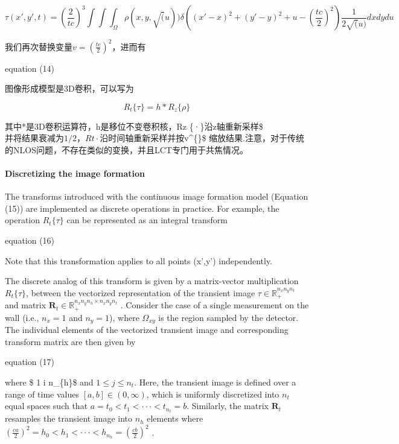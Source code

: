 \documentclass[11pt]{article}
\begin{document}
\[\tau(x',y',t)=(\frac{2}{tc})^{3}\int\int\int_{\Omega}\rho(x,y,\sqrt(u))\delta((x'-x)^{2}+(y'-y)^{2}+u-(\frac{tc}{2})^{2})\frac{1}{2\sqrt(u)}dxdydu\]

我们再次替换变量\(v=({\frac{tc}{2}})^{2}\)，进而有

 equation (14)

图像形成模型是3D卷积，可以写为

\[R_{t}\{\tau\}=h*R_{z}\{\rho\}\]

其中*是3D卷积运算符，h是移位不变卷积核，Rz \{·\}沿z轴重新采样\$
\rho \(并将结果衰减为1/2\)\(，Rt { ·}沿时间轴重新采样\)\rho\(并按\)v\^{}\{\}\$
缩放结果.注意，对于传统的NLOS问题，不存在类似的变换，并且LCT专门用于共焦情况。

    \paragraph{Discretizing the image
formation}\label{discretizing-the-image-formation}

The transforms introduced with the continuous image formation model
(Equation (15)) are implemented as discrete operations in practice. For
example, the operation \(R_{t}\{\tau\}\) can be represented as an
integral transform

 equation (16)

Note that this transformation applies to all points (x',y')
independently.

The discrete analog of this transform is given by a matrix-vector
multiplication \(R_{t}\{\tau\}\), between the vectorized representation
of the transient image \(\tau\in \mathbb{R}_{+}^{n_{x}n_{y}n_{t}}\) and
matrix
\(\textbf{R}_{t}\in \mathbb{R}_{+}^{n_{x}n_{y}n_{h}\times n_{x}n_{y}n_{t}}\)
. Consider the case of a single measurement on the wall (i.e.,
\(n_{x} = 1\) and \(n_{y} = 1\)), where \(\Omega_{xy}\) is the region
sampled by the detector. The individual elements of the vectorized
transient image and corresponding transform matrix are then given by

 equation (17)

where \$ 1 \leqslant i \leqslant n\_\{h\}\$ and
\(1 \leqslant j \leqslant n_{t}\). Here, the transient image is defined
over a range of time values \([a,b] \in (0,\infty)\), which is uniformly
discretized into \(n_{t}\) equal spaces such that
\(a = t_0 < t_1 < ··· < t_{n_{t}} = b\). Similarly, the matrix
\(\textbf {R}_{t}\) resamples the transient image into \(n_h\) elements
where
\((\frac{ca}{2})^{2}=h_{0}< h_{1} < ··· < h_{n_{h}} = (\frac{cb}{2})^{2}\)
.
\end{document}
